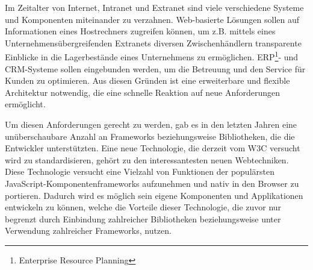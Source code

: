 Im Zeitalter von Internet, Intranet und Extranet sind viele verschiedene Systeme und Komponenten miteinander zu verzahnen. Web-basierte Lösungen sollen auf Informationen eines Hostrechners zugreifen können, um z.B. mittels eines Unternehmensübergreifenden Extranets diversen Zwischenhändlern transparente Einblicke in die Lagerbestände eines Unternehmens zu ermöglichen. ERP\footnote{Enterprise Resource Planning}- und CRM-Systeme sollen eingebunden werden, um die Betreuung und den Service für Kunden zu optimieren. Aus diesen Gründen ist eine erweiterbare und flexible Architektur notwendig, die eine schnelle Reaktion auf neue Anforderungen ermöglicht.

Um diesen Anforderungen gerecht zu werden, gab es in den letzten Jahren eine unüberschaubare Anzahl an Frameworks beziehungsweise Bibliotheken, die die Entwickler unterstützten. Eine neue Technologie, die derzeit vom W3C versucht wird zu standardisieren, gehört zu den interessantesten neuen Webtechniken. Diese Technologie versucht eine Vielzahl von Funktionen der populärsten JavaScript-Komponentenframeworks aufzunehmen und nativ in den Browser zu portieren. Dadurch wird es möglich sein eigene Komponenten und Applikationen entwickeln zu können, welche die Vorteile dieser Technologie, die zuvor nur begrenzt durch Einbindung zahlreicher Bibliotheken beziehungsweise unter Verwendung zahlreicher Frameworks, nutzen.

